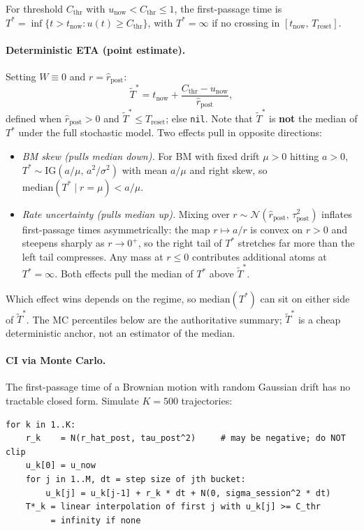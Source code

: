\documentclass[11pt]{article}
\newcommand{\rpost}{\hat r_{\text{post}}}
\newcommand{\taupostsq}{\tau_{\text{post}}^2}
\newcommand{\unow}{u_{\text{now}}}
\newcommand{\tnow}{t_{\text{now}}}
\newcommand{\Treset}{T_{\text{reset}}}
\newcommand{\Cthr}{C_{\text{thr}}}
\newcommand{\Tstar}{T^\ast}
\begin{document}
For threshold $\Cthr$ with $\unow < \Cthr \leq 1$, the first-passage time is
$\Tstar = \inf\{t > \tnow : u(t) \geq \Cthr\}$, with $\Tstar = \infty$ if no
crossing in $[\tnow,\, \Treset]$.

\paragraph{Deterministic ETA (point estimate).} Setting $W \equiv 0$ and $r
= \rpost$:
\[
  \tilde\Tstar = \tnow + \frac{\Cthr - \unow}{\rpost},
\]
defined when $\rpost > 0$ and $\tilde\Tstar \leq \Treset$; else
\texttt{nil}. Note that $\tilde\Tstar$ is \textbf{not} the median of
$\Tstar$ under the full stochastic model. Two effects pull in opposite
directions:

\begin{itemize}
  \item \emph{BM skew (pulls median down).} For BM with fixed drift $\mu > 0$
    hitting $a > 0$, $\Tstar \sim \mathrm{IG}(a/\mu,\, a^2/\sigma^2)$ with
    mean $a/\mu$ and right skew, so $\mathrm{median}(\Tstar \mid r{=}\mu) <
    a/\mu$.
  \item \emph{Rate uncertainty (pulls median up).} Mixing over $r \sim
    \mathcal{N}(\rpost,\, \taupostsq)$ inflates first-passage times
    asymmetrically: the map $r \mapsto a/r$ is convex on $r > 0$ and
    steepens sharply as $r \to 0^+$, so the right tail of $\Tstar$
    stretches far more than the left tail compresses. Any mass at $r \leq
    0$ contributes additional atoms at $\Tstar = \infty$. Both effects pull
    the median of $\Tstar$ above $\tilde\Tstar$.
\end{itemize}

Which effect wins depends on the regime, so $\mathrm{median}(\Tstar)$ can
sit on either side of $\tilde\Tstar$. The MC percentiles below are the
authoritative summary; $\tilde\Tstar$ is a cheap deterministic anchor, not
an estimator of the median.

\paragraph{CI via Monte Carlo.} The first-passage time of a Brownian motion
with random Gaussian drift has no tractable closed form. Simulate $K = 500$
trajectories:

\begin{lstlisting}
for k in 1..K:
    r_k    = N(r_hat_post, tau_post^2)     # may be negative; do NOT clip
    u_k[0] = u_now
    for j in 1..M, dt = step size of jth bucket:
        u_k[j] = u_k[j-1] + r_k * dt + N(0, sigma_session^2 * dt)
    T*_k = linear interpolation of first j with u_k[j] >= C_thr
         = infinity if none
\end{lstlisting}
\end{document}
